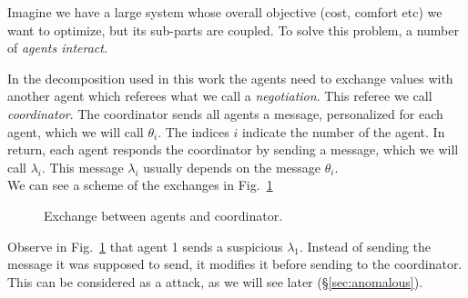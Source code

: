 \documentclass[../main.tex]{subfiles}
\begin{document}
\begin{example}\label{ex:qualitative_example}
  Imagine we have a large system whose overall objective (cost, comfort etc) we want to optimize, but its sub-parts are coupled.
  To solve this problem, a number of \emph{agents interact}.

  In the decomposition used in this work the agents need to exchange values with another agent which referees what we call a \emph{negotiation}. This referee we call \emph{coordinator}.
  The coordinator sends all agents a message, personalized for each agent, which we will call $\theta_{i}$. The indices $i$ indicate the number of the agent.
  In return, each agent responds the coordinator by sending a message, which we will call $\lambda_{i}$.
  This message $\lambda_{i}$ usually depends on the message $\theta_{i}$.\\
  We can see a scheme of the exchanges in Fig.~\ref{fig:ex_exchange_agents}


  \begin{figure}[H]
    \centering
    \caption{Exchange between agents and coordinator.}\label{fig:ex_exchange_agents}
  \end{figure}
  Observe in Fig.~\ref{fig:ex_exchange_agents} that agent 1 sends a suspicious $\lambda_{1}$. Instead of sending the message it was supposed to send, it modifies it before sending to the coordinator.
  This can be considered as a \fdi{} attack, as we will see later (\S\ref{sec:anomalous}).


\end{example}
\end{document}
